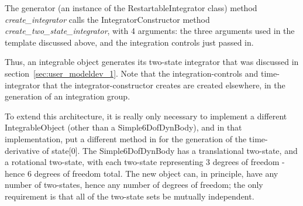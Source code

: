 The generator (an instance of the RestartableIntegrator class) method 
\textit{create\_integrator} calls the IntegratorConstructor method 
\textit{create\_two\_state\_integrator}, with 4 arguments: the three arguments 
used in the 
template discussed above, and the integration controls just passed in.

Thus, an integrable object generates its two-state integrator that was 
discussed in section~\ref{sec:user_modeldev_1}.  Note that the 
integration-controls and time-integrator that the integrator-constructor 
creates are created elsewhere, in the generation of an integration group.

To extend this architecture, it is really only necessary to implement a 
different IntegrableObject (other than a Simple6DofDynBody), and in that 
implementation, put a different method in for the generation of the 
time-derivative of state[0].  The Simple6DofDynBody has a translational 
two-state, and a rotational two-state, with each two-state representing 3 
degrees of freedom - hence 6 degrees of freedom total.  The new object can, in 
principle, have any number of two-states, hence any number of degrees of 
freedom; the only requirement is that all of the two-state sets be mutually 
independent.
